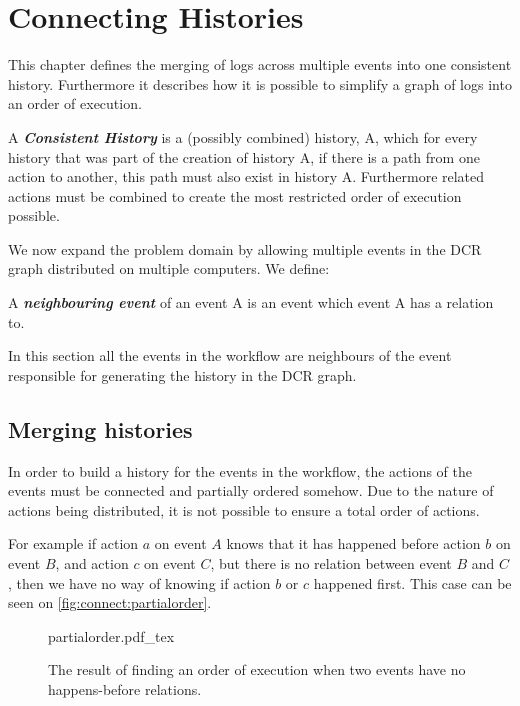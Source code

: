 \chapter{Connecting Histories} 
\label{chap:connecting-histories}
	This chapter defines the merging of logs across multiple events into one consistent history. Furthermore it describes how it is possible to simplify a graph of logs into an order of execution.
	
	\begin{definition}
		A \textit{\textbf{Consistent History}} is a (possibly combined) history, A, which for every history that was part of the creation of history A, if there is a path from one action to another, this path must also exist in history A. Furthermore related actions must be combined to create the most restricted order of execution possible.
	\end{definition} %
	\noindent We now expand the problem domain by allowing multiple events in the DCR graph distributed on multiple computers. We define:
	\begin{definition}
		A \textit{\textbf{neighbouring event}} of an event A is an event which event A has a relation to. 
	\end{definition}
	\noindent In this section all the events in the workflow are neighbours of the event responsible for generating the history in the DCR graph.
	
	\section{Merging histories} 
	In order to build a history for the events in the workflow, the actions of the events must be connected and partially ordered somehow. Due to the nature of actions being distributed, it is not possible to ensure a total order of actions. 
	
	For example if action $a$ on event $A$ knows that it has happened before action $b$ on event $B$, and action $c$ on event $C$, but there is no relation between event $B$ and $C$, then we have no way of knowing if action $b$ or $c$ happened first. This case can be seen on \autoref{fig:connect:partialorder}.
	
	\begin{figure}
		\centering
		{partialorder.pdf_tex}
		\caption{The result of finding an order of execution when two events have no happens-before relations.}
		\label{fig:connect:partialorder}
	\end{figure}
	
